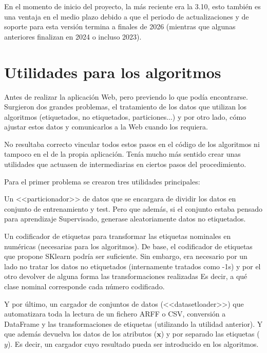 En el momento de inicio del proyecto, la más reciente era la 3.10, esto también
es una ventaja en el medio plazo debido a que el periodo de actualizaciones y de
soporte para esta versión termina a finales de 2026 (mientras que algunas
anteriores finalizan en 2024 o incluso 2023).

\section{Utilidades para los algoritmos}

Antes de realizar la aplicación Web, pero previendo lo que podía encontrarse.
Surgieron dos grandes problemas, el tratamiento de los datos que utilizan los
algoritmos (etiquetados, no etiquetados, particiones...) y por otro lado, cómo
ajustar estos datos y comunicarlos a la Web cuando los requiera.

No resultaba correcto vincular todos estos pasos en el código de los algoritmos
ni tampoco en el de la propia aplicación. Tenía mucho más sentido crear unas
utilidades que actuasen de intermediarias en ciertos pasos del procedimiento.

Para el primer problema se crearon tres utilidades principales: 

Un <<particionador>> de datos que se encargara de dividir los datos en conjunto
de entrenamiento y test. Pero que además, si el conjunto estaba pensado para
aprendizaje Supervisado, generase aleatoriamente datos no etiquetados.

Un codificador de etiquetas para transformar las etiquetas nominales en
numéricas (necesarias para los algoritmos). De base, el codificador de etiquetas
que propone SKlearn podría ser suficiente. Sin embargo, era necesario por un
lado no tratar los datos no etiquetados (internamente tratados como -1s) y por
el otro devolver de alguna forma las transformaciones realizadas Es decir, a qué
clase nominal corresponde cada número codificado.

Y por último, un cargador de conjuntos de datos (<<datasetloader>>) que
automatizara toda la lectura de un fichero ARFF o CSV, conversión a DataFrame y
las transformaciones de etiquetas (utilizando la utilidad anterior). Y que
además devuelva los datos de los atributos ($\mathbf{x}$) y por separado las
etiquetas ($y$). Es decir, un cargador cuyo resultado pueda ser introducido en los
algoritmos. 

